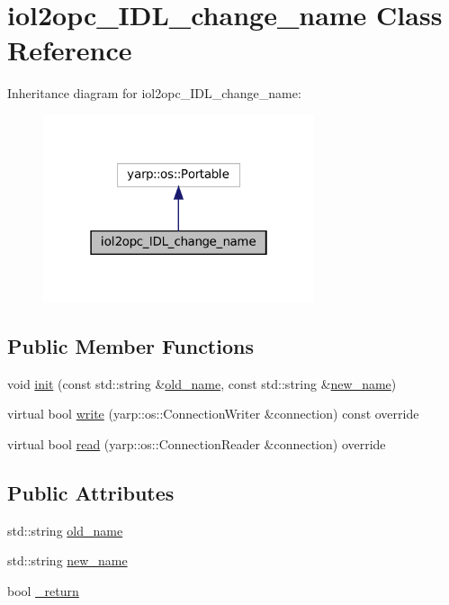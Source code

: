 \hypertarget{classiol2opc__IDL__change__name}{}\section{iol2opc\+\_\+\+I\+D\+L\+\_\+change\+\_\+name Class Reference}
\label{classiol2opc__IDL__change__name}


Inheritance diagram for iol2opc\+\_\+\+I\+D\+L\+\_\+change\+\_\+name\+:
\nopagebreak
\begin{figure}[H]
\begin{center}
\leavevmode
\includegraphics[width=226pt]{classiol2opc__IDL__change__name__inherit__graph}
\end{center}
\end{figure}
\subsection*{Public Member Functions}
\begin{DoxyCompactItemize}
\item 
void \hyperlink{classiol2opc__IDL__change__name_a395eebcf24fec14b5575757521ef903c}{init} (const std\+::string \&\hyperlink{classiol2opc__IDL__change__name_aed17f20d8287ee82fb764e15008f47f7}{old\+\_\+name}, const std\+::string \&\hyperlink{classiol2opc__IDL__change__name_a74253660427d4576691c34b12cf11bcd}{new\+\_\+name})
\item 
virtual bool \hyperlink{classiol2opc__IDL__change__name_a7fe9fcdf730c88383fdae5da53d744f8}{write} (yarp\+::os\+::\+Connection\+Writer \&connection) const override
\item 
virtual bool \hyperlink{classiol2opc__IDL__change__name_a2b2895ab40418d48050ebb16d71f6ab3}{read} (yarp\+::os\+::\+Connection\+Reader \&connection) override
\end{DoxyCompactItemize}
\subsection*{Public Attributes}
\begin{DoxyCompactItemize}
\item 
std\+::string \hyperlink{classiol2opc__IDL__change__name_aed17f20d8287ee82fb764e15008f47f7}{old\+\_\+name}
\item 
std\+::string \hyperlink{classiol2opc__IDL__change__name_a74253660427d4576691c34b12cf11bcd}{new\+\_\+name}
\item 
bool \hyperlink{classiol2opc__IDL__change__name_a8938684ed1f4d32c71a848b9bd198259}{\+\_\+return}
\end{DoxyCompactItemize}


